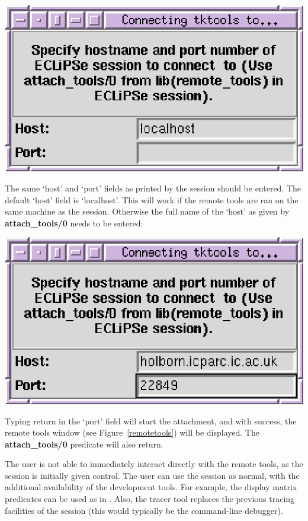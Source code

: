 \begin{center}
\includegraphics{remotecon.eps}
\end{center}

The same `host' and `port' fields as printed by the {\eclipse} session should 
be entered. The default `host' field is `localhost'. This will work if the
remote tools are ran on the same machine as the {\eclipse}
session. Otherwise the full name of the `host' as given by {\bf
attach_tools/0} needs to be entered:

\begin{center}
\includegraphics{remotecon2.eps}
\end{center}

Typing return in the `port' field will start the attachment, and with
success, the remote tools window (see Figure~\ref{remotetools}) will be
displayed. The {\bf attach_tools/0} predicate will also return.

The user is not able to immediately interact directly with the remote
tools, as the {\eclipse} session is initially given control. The user can
use the {\eclipse} session as normal, with the additional availability of
the development tools. For example, the display matrix predicates can be
used as in {\tkeclipse}. Also, the tracer tool replaces the previous
tracing facilities of the {\eclipse} session (this would typically be the
command-line debugger).

